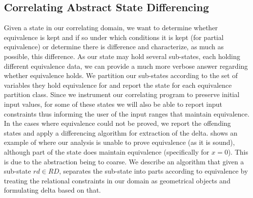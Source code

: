\subsection{Correlating Abstract State Differencing} 
Given a state in our correlating domain, we want to determine whether equivalence is kept and if so under which conditions it is kept (for partial equivalence) or determine there is difference and characterize, as much as possible, this difference. As our state may hold several sub-states, each holding different equivalence data, we can provide a much more verbose answer regarding whether equivalence holds. We partition our sub-states according to the set of variables they hold equivalence for and report the state for each equivalence partition class. Since we instrument our correlating program to preserve initial input values, for some of these states we will also be able to report input constraints thus informing the user of the input ranges that maintain equivalence. In the cases where equivalence could not be proved, we report the offending states and apply a differencing algorithm for extraction of the delta.  shows an example of where our analysis is unable to prove equivalence (as it is sound), although part of the state does maintain equivalence (specifically for $x=0$). This is due to the abstraction being to coarse. We describe an algorithm that given a sub-state $rd \in RD$, separates the sub-state into parts according to equivalence by treating the relational constraints in our domain as geometrical objects and formulating delta based on that.

